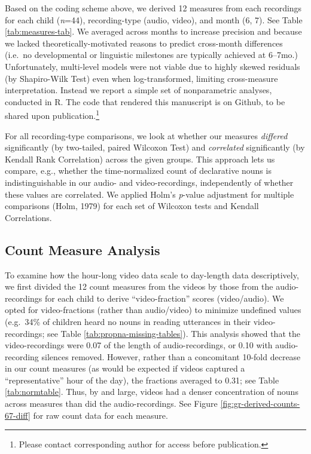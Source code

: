 \documentclass[man]{apa6}
\theoremstyle{definition}
\theoremstyle{definition}
\theoremstyle{definition}
\theoremstyle{remark}
\begin{document}
Based on the coding scheme above, we derived 12 measures from each
recordings for each child (\emph{n}=44), recording-type (audio, video),
and month (6, 7). See Table \ref{tab:measures-tab}. We averaged across
months to increase precision and because we lacked
theoretically-motivated reasons to predict cross-month differences
(i.e.~no developmental or linguistic milestones are typically achieved
at 6--7mo.) Unfortunately, multi-level models were not viable due to
highly skewed residuals (by Shapiro-Wilk Test) even when
log-transformed, limiting cross-measure interpretation. Instead we
report a simple set of nonparametric analyses, conducted in R. The code
that rendered this manuscript is on Github, to be shared upon
publication.\footnote{Please contact corresponding author for access before publication.}

For all recording-type comparisons, we look at whether our measures
\emph{differed} significantly (by two-tailed, paired Wilcoxon Test) and
\emph{correlated} significantly (by Kendall Rank Correlation) across the
given groups. This approach lets us compare, e.g., whether the
time-normalized count of declarative nouns is indistinguishable in our
audio- and video-recordings, independently of whether these values are
correlated. We applied Holm's \emph{p}-value adjustment for multiple
comparisons (Holm, 1979) for each set of Wilcoxon tests and Kendall
Correlations.

\hypertarget{count-measure-analysis}{%
\subsection{Count Measure Analysis}\label{count-measure-analysis}}

To examine how the hour-long video data scale to day-length data
descriptively, we first divided the 12 count measures from the videos by
those from the audio-recordings for each child to derive
\enquote{video-fraction} scores (video/audio). We opted for
video-fractions (rather than audio/video) to minimize undefined values
(e.g.~34\% of children heard no nouns in reading utterances in their
video-recordings; see Table \ref{tab:propna-missing-tables}). This
analysis showed that the video-recordings were 0.07 of the length of
audio-recordings, or 0.10 with audio-recording silences removed.
However, rather than a concomitant 10-fold decrease in our count
measures (as would be expected if videos captured a
\enquote{representative} hour of the day), the fractions averaged to
0.31; see Table \ref{tab:normtable}. Thus, by and large, videos had a
denser concentration of nouns across measures than did the
audio-recordings. See Figure \ref{fig:gr-derived-counts-67-diff} for raw
count data for each measure.
\end{document}
